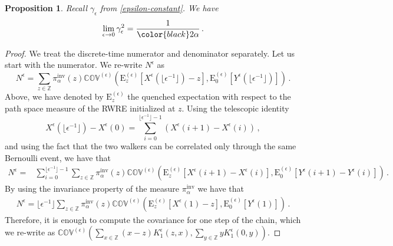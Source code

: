 \documentclass[a4paper,11pt,oneside,reqno]{amsart}
\newtheorem{proposition}[theorem]{Proposition}
\theoremstyle{definition}
\numberwithin{equation}{section}
\begin{document}
\begin{proposition}\label{proposition-limitingConstant}
	Recall $\gamma_{\epsilon}$ from \eqref{epsilon-constant}. We have
	\begin{equation}\label{statement-proposition-gamma}
		\lim_{\epsilon\to 0}\gamma_{\epsilon}^{2}=\frac{1}{{\color{black}2}\alpha}\,.
	\end{equation}
\end{proposition}
\begin{proof} We treat the discrete-time numerator and denominator separately. 
	Let us start with the numerator. We re-write $N^{\epsilon}$ as
	\begin{equation}\label{N-epsilon}
		N^{\epsilon}=	\sum_{z\in \mathbb{Z}}\pi^{\text{inv}}_{\alpha}(z)\mathbb{COV}^{(\epsilon)}\left(\mathrm{E}_{z}^{(\epsilon)}\left[X^{\epsilon}(\lfloor \epsilon^{-1}\rfloor)-z\right],\mathrm{E}_{0}^{(\epsilon)}[Y^{\epsilon}(\lfloor \epsilon^{-1}\rfloor)]\right)\,.
	\end{equation}
		Above, we have denoted by $\mathrm{E}^{(\epsilon)}_{z}$ the quenched expectation with respect to the path space measure of the RWRE initialized at $z$. 
			Using the telescopic identity 
		\begin{equation}\label{telescopic}
			X^{\epsilon}(\lfloor\epsilon^{-1}\rfloor)-X^{\epsilon}(0)=\sum_{i=0}^{\lfloor\epsilon^{-1}\rfloor-1}\left(X^{\epsilon}(i+1)-X^{\epsilon}(i)\right)\,,
		\end{equation}
		and using the fact that the two walkers can be correlated only through the same Bernoulli event, we have that 
		\begin{equation*}
			\begin{split}
				N^{\epsilon}=&
				\sum_{i=0}^{\lfloor\epsilon^{-1}\rfloor-1}\sum_{z\in \mathbb{Z}}\pi^{\text{inv}}_{\alpha}(z)\mathbb{COV}^{(\epsilon)}\left(\mathrm{E}_{z}^{(\epsilon)}\left[X^{\epsilon}(i+1)-X^{\epsilon}( i)\right],\mathrm{E}_{0}^{(\epsilon)}\left[Y^{\epsilon}(i+1)-Y^{\epsilon}( i)\right]\right)\,.
			\end{split}
		\end{equation*}
		By using the invariance property of the measure $\pi^{\text{inv}}_{\alpha}$ we have that 
		\begin{equation*}
			\begin{split}
				N^{\epsilon}=
				\lfloor\epsilon^{-1}\rfloor\sum_{z\in \mathbb{Z}}\pi^{\text{inv}}_{\alpha}(z)\mathbb{COV}^{(\epsilon)}\left(\mathrm{E}_{z}^{(\epsilon)}\left[X^{\epsilon}(1)-z\right],\mathrm{E}_{0}^{(\epsilon)}\left[Y^{\epsilon}(1)\right]\right)\,.
			\end{split}
		\end{equation*}
		Therefore, it is enough to compute the covariance for one step of the chain, which we re-write as $\mathbb{COV}^{(\epsilon)}\left(\sum_{x\in \mathbb{Z}}(x-z)K_{1}^{\epsilon}(z,x),\sum_{y\in \mathbb{Z}}yK_{1}^{\epsilon}(0,y)\right)$. 


\end{proof}
\end{document}
